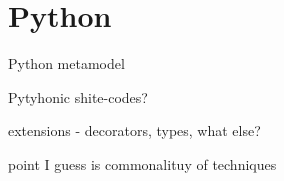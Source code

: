 \section{Python}

Python metamodel




Pytyhonic shite-codes?



extensions - decorators, types, what else?



point I guess is commonalituy of techniques 



